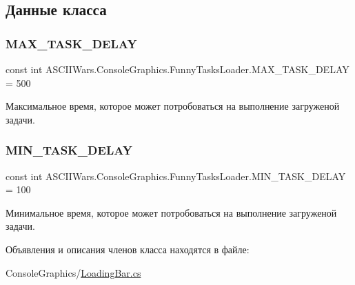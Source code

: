 \subsection{Данные класса}
\hypertarget{class_a_s_c_i_i_wars_1_1_console_graphics_1_1_funny_tasks_loader_a0c34f365b46e3cc7e9974d5412b05f6c}{}\label{class_a_s_c_i_i_wars_1_1_console_graphics_1_1_funny_tasks_loader_a0c34f365b46e3cc7e9974d5412b05f6c} 
\subsubsection{\texorpdfstring{M\+A\+X\+\_\+\+T\+A\+S\+K\+\_\+\+D\+E\+L\+AY}{MAX\_TASK\_DELAY}}
{\footnotesize\ttfamily const int A\+S\+C\+I\+I\+Wars.\+Console\+Graphics.\+Funny\+Tasks\+Loader.\+M\+A\+X\+\_\+\+T\+A\+S\+K\+\_\+\+D\+E\+L\+AY = 500\hspace{0.3cm}{\ttfamily [private]}}



Максимальное время, которое может потробоваться на выполнение загруженой задачи. 

\hypertarget{class_a_s_c_i_i_wars_1_1_console_graphics_1_1_funny_tasks_loader_a9008864a7b23b6e86b350b5c2097151c}{}\label{class_a_s_c_i_i_wars_1_1_console_graphics_1_1_funny_tasks_loader_a9008864a7b23b6e86b350b5c2097151c} 
\subsubsection{\texorpdfstring{M\+I\+N\+\_\+\+T\+A\+S\+K\+\_\+\+D\+E\+L\+AY}{MIN\_TASK\_DELAY}}
{\footnotesize\ttfamily const int A\+S\+C\+I\+I\+Wars.\+Console\+Graphics.\+Funny\+Tasks\+Loader.\+M\+I\+N\+\_\+\+T\+A\+S\+K\+\_\+\+D\+E\+L\+AY = 100\hspace{0.3cm}{\ttfamily [private]}}



Минимальное время, которое может потробоваться на выполнение загруженой задачи. 



Объявления и описания членов класса находятся в файле\+:\begin{DoxyCompactItemize}
\item 
Console\+Graphics/\hyperlink{_loading_bar_8cs}{Loading\+Bar.\+cs}\end{DoxyCompactItemize}
